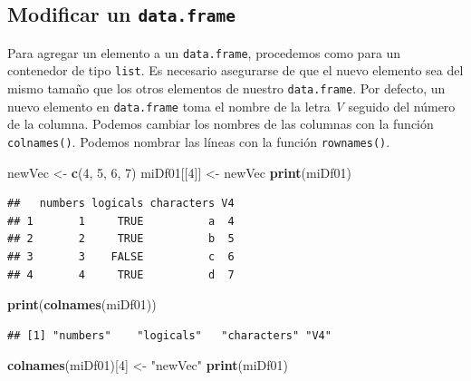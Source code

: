 \documentclass[
]{book}
\newenvironment{Shaded}{\begin{snugshade}}{\end{snugshade}}
\newcommand{\DecValTok}[1]{\textcolor[rgb]{0.00,0.00,0.81}{#1}}
\newcommand{\KeywordTok}[1]{\textcolor[rgb]{0.13,0.29,0.53}{\textbf{#1}}}
\newcommand{\NormalTok}[1]{#1}
\newcommand{\StringTok}[1]{\textcolor[rgb]{0.31,0.60,0.02}{#1}}
\begin{document}
\hypertarget{modificar-un-data.frame}{%
\subsection{\texorpdfstring{Modificar un \texttt{data.frame}}{Modificar un data.frame}}\label{modificar-un-data.frame}}

Para agregar un elemento a un \texttt{data.frame}, procedemos como para un contenedor de tipo \texttt{list}. Es necesario asegurarse de que el nuevo elemento sea del mismo tamaño que los otros elementos de nuestro \texttt{data.frame}. Por defecto, un nuevo elemento en \texttt{data.frame} toma el nombre de la letra \emph{V} seguido del número de la columna. Podemos cambiar los nombres de las columnas con la función \texttt{colnames()}. Podemos nombrar las líneas con la función \texttt{rownames()}.

\begin{Shaded}
\begin{Highlighting}[]
\NormalTok{newVec <-}\StringTok{ }\KeywordTok{c}\NormalTok{(}\DecValTok{4}\NormalTok{, }\DecValTok{5}\NormalTok{, }\DecValTok{6}\NormalTok{, }\DecValTok{7}\NormalTok{)}
\NormalTok{miDf01[[}\DecValTok{4}\NormalTok{]] <-}\StringTok{ }\NormalTok{newVec}
\KeywordTok{print}\NormalTok{(miDf01)}
\end{Highlighting}
\end{Shaded}

\begin{verbatim}
##   numbers logicals characters V4
## 1       1     TRUE          a  4
## 2       2     TRUE          b  5
## 3       3    FALSE          c  6
## 4       4     TRUE          d  7
\end{verbatim}

\begin{Shaded}
\begin{Highlighting}[]
\KeywordTok{print}\NormalTok{(}\KeywordTok{colnames}\NormalTok{(miDf01))}
\end{Highlighting}
\end{Shaded}

\begin{verbatim}
## [1] "numbers"    "logicals"   "characters" "V4"
\end{verbatim}

\begin{Shaded}
\begin{Highlighting}[]
\KeywordTok{colnames}\NormalTok{(miDf01)[}\DecValTok{4}\NormalTok{] <-}\StringTok{ "newVec"}
\KeywordTok{print}\NormalTok{(miDf01)}
\end{Highlighting}
\end{Shaded}
\end{document}
